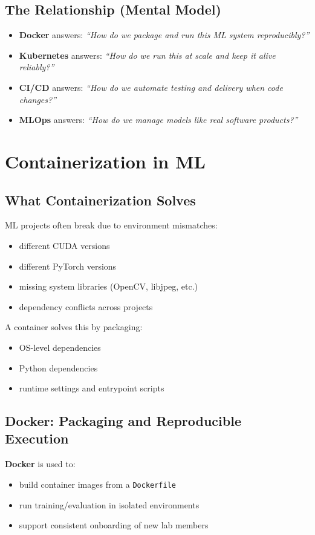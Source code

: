 \documentclass[11pt]{article}
\begin{document}
\subsection{The Relationship (Mental Model)}
\begin{itemize}
  \item \textbf{Docker} answers: \emph{``How do we package and run this ML system reproducibly?''}
  \item \textbf{Kubernetes} answers: \emph{``How do we run this at scale and keep it alive reliably?''}
  \item \textbf{CI/CD} answers: \emph{``How do we automate testing and delivery when code changes?''}
  \item \textbf{MLOps} answers: \emph{``How do we manage models like real software products?''}
\end{itemize}

\section{Containerization in ML}

\subsection{What Containerization Solves}
ML projects often break due to environment mismatches:
\begin{itemize}
  \item different CUDA versions
  \item different PyTorch versions
  \item missing system libraries (OpenCV, libjpeg, etc.)
  \item dependency conflicts across projects
\end{itemize}

A container solves this by packaging:
\begin{itemize}
  \item OS-level dependencies
  \item Python dependencies
  \item runtime settings and entrypoint scripts
\end{itemize}

\subsection{Docker: Packaging and Reproducible Execution}
\textbf{Docker} is used to:
\begin{itemize}
  \item build container images from a \texttt{Dockerfile}
  \item run training/evaluation in isolated environments
  \item support consistent onboarding of new lab members
\end{itemize}
\end{document}
